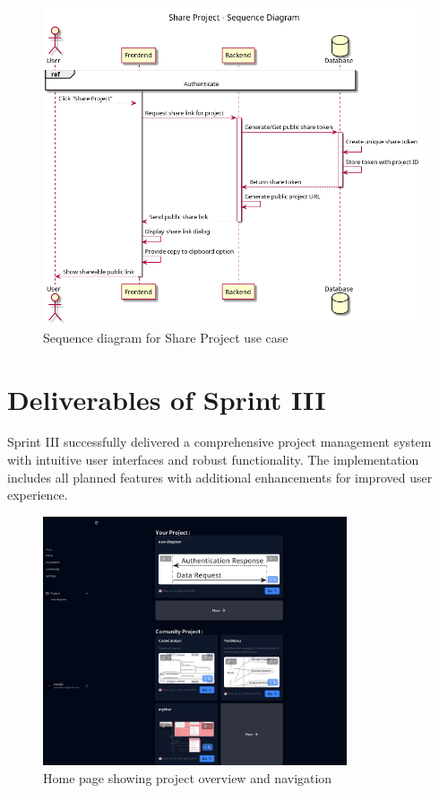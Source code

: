 \begin{figure}[H]
\centering
\includegraphics[width=\textwidth]{conception/SprintIII/sequence_diagrams/sequence_projectManagement_3_6_ShareProject.png}
\caption{Sequence diagram for Share Project use case}
\label{fig:seq_share_project}
\end{figure}

\section{Deliverables of Sprint III}

Sprint III successfully delivered a comprehensive project management system with intuitive user interfaces and robust functionality. The implementation includes all planned features with additional enhancements for improved user experience.

\begin{figure}[H]
\centering
\includegraphics[width=0.8\textwidth]{screenshots/home.png}
\caption{Home page showing project overview and navigation}
\label{fig:home_page}
\end{figure}

